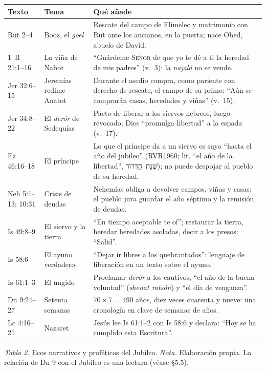 \documentclass[11pt,letterpaper]{article}
\newcommand{\heb}[1]{\mbox{\foreignlanguage{hebrew}{#1}}}
\newcommand{\SENOR}{\textsc{Señor}}
\newcommand{\pie}[1]{\par{\footnotesize\color{sepia}#1\par}}
\begin{document}
\begin{center}\begin{minipage}{\linewidth}\centering\small\renewcommand{\arraystretch}{1.18}
\begin{tabular}{@{}L{2.4cm}L{4.6cm}L{7.6cm}@{}}
\toprule
\textbf{Texto} & \textbf{Tema} & \textbf{Qué añade} \\ \midrule
Rut 2--4 & Booz, el \emph{goel} & Rescate del campo de Elimelec y matrimonio con Rut ante los ancianos, en la puerta; nace Obed, abuelo de David. \\
1~R 21:1--16 & La viña de Nabot & ``Guárdeme \SENOR{} de que yo te dé a ti la heredad de mis padres'' (v.~3): la \emph{najalá} no se vende. \\
Jer 32:6--15 & Jeremías redime Anatot & Durante el asedio compra, como pariente con derecho de rescate, el campo de su primo: ``Aún se comprarán casas, heredades y viñas'' (v.~15). \\
Jer 34:8--22 & El \emph{derór} de Sedequías & Pacto de liberar a los siervos hebreos, luego revocado; Dios ``promulga libertad'' a la espada (v.~17). \\
Ez 46:16--18 & El príncipe & Lo que el príncipe da a un siervo es suyo ``hasta el año del jubileo'' (RVR1960; lit. ``el año de la libertad'', \heb{שְׁנַת הַדְּרוֹר}); no puede despojar al pueblo de su heredad. \\
Neh 5:1--13; 10:31 & Crisis de deudas & Nehemías obliga a devolver campos, viñas y casas; el pueblo jura guardar el año séptimo y la remisión de deudas. \\
Is 49:8--9 & El siervo y la tierra & ``En tiempo aceptable te oí''; restaurar la tierra, heredar heredades asoladas, decir a los presos: ``Salid''. \\
Is 58:6 & El ayuno verdadero & ``Dejar ir libres a los quebrantados'': lenguaje de liberación en un texto sobre el ayuno. \\
Is 61:1--3 & El ungido & Proclamar \emph{derór} a los cautivos, ``el año de la buena voluntad'' (\emph{shenat ratsón}) y ``el día de venganza''. \\
Dn 9:24--27 & Setenta semanas & 70\,×\,7 = 490 años, diez veces cuarenta y nueve: una cronología en clave de semanas de años. \\
Lc 4:16--21 & Nazaret & Jesús lee Is 61:1--2 con Is 58:6 y declara: ``Hoy se ha cumplido esta Escritura''. \\
\bottomrule
\end{tabular}\par
\pie{\textit{Tabla 2.} Ecos narrativos y proféticos del Jubileo. \textit{Nota.} Elaboración propia. La relación de Dn 9 con el Jubileo es una lectura (véase §5.5).}
\end{minipage}\end{center}
\end{document}
